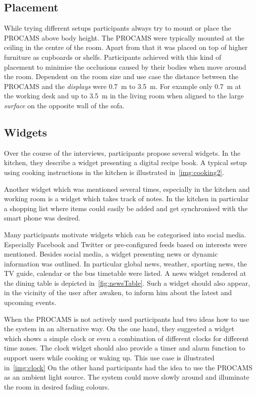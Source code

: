 \subsection{Placement}
While trying different setups participants always try to mount or place the PROCAMS above body height.
The \ac{PROCAMS} were typically mounted at the ceiling in the centre of the room. Apart from that it was placed on top of higher furniture as cupboards or shelfs. Participants achieved with this kind of placement to minimise the occlusions caused by their bodies when move around the room. 
Dependent on the room size and use case the distance between the \ac{PROCAMS} and the \emph{displays} were \SI{0.7}{\metre} to \SI{3.5}{\metre}. For example only \SI{0.7}{\metre} at the working desk and up to \SI{3.5}{\metre} in the living room when aligned to the large \emph{surface} on the opposite wall of the sofa.

\subsection{Widgets}
Over the course of the interviews, participants propose several widgets. In the kitchen, they describe a widget presenting a digital recipe book. A typical setup using cooking instructions in the kitchen is illustrated in~\autoref{img:cooking2}. 

Another widget which was mentioned several times, especially in the kitchen and working room is a widget which takes track of notes.
In the kitchen in particular a shopping list where items could easily be added and get synchronised with the smart phone was desired. 

Many participants motivate widgets which can be categorised into social media. Especially Facebook and Twitter or pre-configured feeds based on interests were mentioned. Besides social media, a widget presenting news or dynamic information was outlined. In particular global news, weather, sporting news, the TV guide, calendar or the bus timetable were listed. A news widget rendered at the dining table is depicted in~\autoref{fig:newsTable}. Such a widget should also appear, in the vicinity of the user after awaken, to inform him about the latest and upcoming events.

When the PROCAMS is not actively used participants had two ideas how to use the system in an alternative way. On the one hand, they suggested a widget which shows a simple clock or even a combination of different clocks for different time zones. The clock widget should also provide a timer and alarm function to support users while cooking or waking up. This use case is illustrated in~\autoref{img:clock}  On the other hand participants had the idea to use the PROCAMS as an ambient light source. The system could move slowly around and illuminate the room in desired fading colours.

